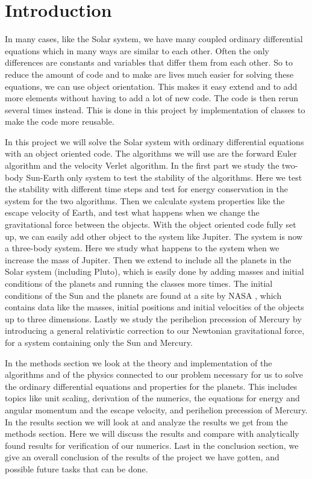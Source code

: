 \documentclass[12pt,a4paper,english]{article}
\begin{document}
\section{Introduction}
\label{sect:Introduction}
In many cases, like the Solar system, we have many coupled ordinary differential equations which in many ways are similar to each other. Often the only differences are constants and variables that differ them from each other. So to reduce the amount of code and to make are lives much easier for solving these equations, we can use object orientation. This makes it easy extend and to add more elements without having to add a lot of new code. The code is then rerun several times instead. This is done in this project by implementation of classes to make the code more reusable.

In this project we will solve the Solar system with ordinary differential equations with an object oriented code. The algorithms we will use are the forward Euler algorithm and the velocity Verlet algorithm. In the first part we study the two-body Sun-Earth only system to test the stability of the algorithms. Here we test the stability with different time steps and test for energy conservation in the system for the two algorithms. Then we calculate system properties like the escape velocity of Earth, and test what happens when we change the gravitational force between the objects. With the object oriented code fully set up, we can easily add other object to the system like Jupiter. The system is now a three-body system. Here we study what happens to the system when we increase the mass of Jupiter. Then we extend to include all the planets in the Solar system (including Pluto), which is easily done by adding masses and initial conditions of the planets and running the classes more times. The initial conditions of the Sun and the planets are found at a site by NASA \cite{horizon}, which contains data like the masses, initial positions and initial velocities of the objects up to three dimensions. Lastly we study the perihelion precession of Mercury by introducing a general relativistic correction to our Newtonian gravitational force, for a system containing only the Sun and Mercury.

In the methods section we look at the theory and implementation of the algorithms and of the physics connected to our problem necessary for us to solve the ordinary differential equations and properties for the planets. This includes topics like unit scaling, derivation of the numerics, the equations for energy and angular momentum and the escape velocity, and perihelion precession of Mercury. In the results section we will look at and analyze the results we get from the methods section. Here we will discuss the results and compare with analytically found results for verification of our numerics. Last in the conclusion section, we give an overall conclusion of the results of the project we have gotten, and possible future tasks that can be done.
\end{document}
